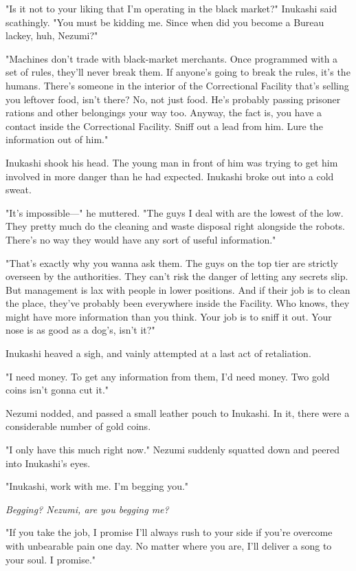 "Is it not to your liking that I'm operating in the black market?"
Inukashi said scathingly. "You must be kidding me. Since when did you
become a Bureau lackey, huh, Nezumi?"

"Machines don't trade with black-market merchants. Once programmed with
a set of rules, they'll never break them. If anyone's going to break the
rules, it's the humans. There's someone in the interior of the
Correctional Facility that's selling you leftover food, isn't there? No,
not just food. He's probably passing prisoner rations and other
belongings your way too. Anyway, the fact is, you have a contact inside
the Correctional Facility. Sniff out a lead from him. Lure the
information out of him."

Inukashi shook his head. The young man in front of him was trying to get
him involved in more danger than he had expected. Inukashi broke out
into a cold sweat.

"It's impossible---" he muttered. "The guys I deal with are the lowest of
the low. They pretty much do the cleaning and waste disposal right
alongside the robots. There's no way they would have any sort of useful
information."

"That's exactly why you wanna ask them. The guys on the top tier are
strictly overseen by the authorities. They can't risk the danger of
letting any secrets slip. But management is lax with people in lower
positions. And if their job is to clean the place, they've probably been
everywhere inside the Facility. Who knows, they might have more
information than you think. Your job is to sniff it out. Your nose is as
good as a dog's, isn't it?"

Inukashi heaved a sigh, and vainly attempted at a last act of
retaliation.

"I need money. To get any information from them, I'd need money. Two
gold coins isn't gonna cut it."

Nezumi nodded, and passed a small leather pouch to Inukashi. In it,
there were a considerable number of gold coins.

"I only have this much right now." Nezumi suddenly squatted down and
peered into Inukashi's eyes.

"Inukashi, work with me. I'm begging you."

\emph{Begging? Nezumi, are you \emph{begging} me?}

"If you take the job, I promise I'll always rush to your side if you're
overcome with unbearable pain one day. No matter where you are, I'll
deliver a song to your soul. I promise."

